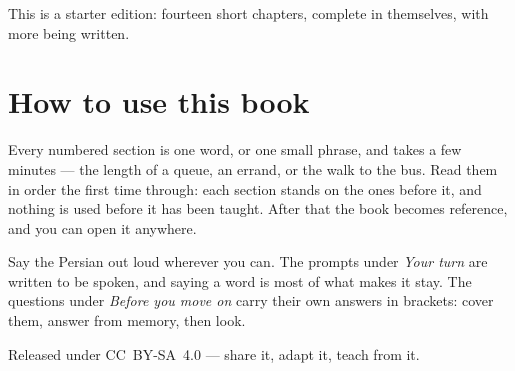 \documentclass[11pt,twoside]{book}
\begin{document}
This is a starter edition: fourteen short chapters, complete in themselves,
with more being written.

\section*{How to use this book}

Every numbered section is one word, or one small phrase, and takes a few
minutes --- the length of a queue, an errand, or the walk to the bus. Read them
in order the first time through: each section stands on the ones before it, and
nothing is used before it has been taught. After that the book becomes
reference, and you can open it anywhere.

Say the Persian out loud wherever you can. The prompts under \emph{Your turn}
are written to be spoken, and saying a word is most of what makes it stay. The
questions under \emph{Before you move on} carry their own answers in brackets:
cover them, answer from memory, then look.

Released under CC~BY-SA~4.0 --- share it, adapt it, teach from it.

\tableofcontents

\mainmatter


\end{document}
